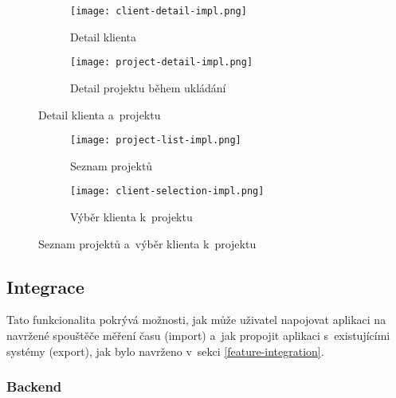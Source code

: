 \begin{figure}[p]
    \centering
    \begin{subfigure}[b]{0.4\textwidth}
		\centering
		\texttt{[image: client-detail-impl.png]}
		\caption{Detail klienta}
		\label{fig:client-detail-impl}
	\end{subfigure}
	\hspace{2cm}
	\begin{subfigure}[b]{0.4\textwidth}
		\centering
		\texttt{[image: project-detail-impl.png]}
		\caption{Detail projektu během ukládání}
		\label{fig:project-detail-impl}
	\end{subfigure}
	\caption{Detail klienta a~projektu}
	\label{fig:client-projet-detail-impl}
\end{figure}

\begin{figure}[p]
    \centering
    \begin{subfigure}[b]{0.4\textwidth}
		\centering
		\texttt{[image: project-list-impl.png]}
		\caption{Seznam projektů}
		\label{fig:project-list-impl}
	\end{subfigure}
	\hspace{2cm}
	\begin{subfigure}[b]{0.4\textwidth}
		\centering
		\texttt{[image: client-selection-impl.png]}
		\caption{Výběr klienta k~projektu}
		\label{fig:client-selection-impl}
	\end{subfigure}
	\caption{Seznam projektů a~výběr klienta k~projektu}
	\label{fig:project-list-client-selection-impl}
\end{figure}

\subsection{Integrace}

Tato funkcionalita pokrývá možnosti, jak může uživatel napojovat aplikaci na navržené spouštěče měření času (import) a~jak propojit aplikaci s~existujícími systémy (export), jak bylo navrženo v~sekci \ref{feature-integration}.

\subsubsection{Backend}

